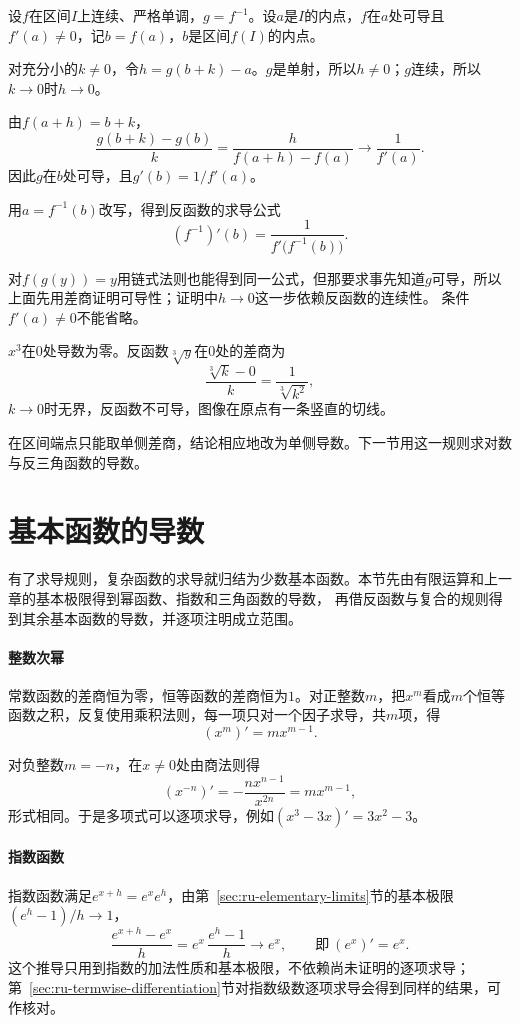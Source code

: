 设$f$在区间$I$上连续、严格单调，$g=f^{-1}$。设$a$是$I$的内点，$f$在$a$处可导且$f'(a)\neq0$，记$b=f(a)$，$b$是区间$f(I)$的内点。

对充分小的$k\neq0$，令$h=g(b+k)-a$。$g$是单射，所以$h\neq0$；$g$连续，所以$k\to0$时$h\to0$。

由$f(a+h)=b+k$，
\[
 \frac{g(b+k)-g(b)}k=\frac h{f(a+h)-f(a)}\to\frac1{f'(a)}.
\]
因此$g$在$b$处可导，且$g'(b)=1/f'(a)$。

用$a=f^{-1}(b)$改写，得到反函数的求导公式
\begin{equation}
 (f^{-1})'(b)=\frac1{f'\bigl(f^{-1}(b)\bigr)}.
 \label{eq:ru-inverse-derivative}
\end{equation}

对$f(g(y))=y$用链式法则也能得到同一公式，但那要求事先知道$g$可导，所以上面先用差商证明可导性；证明中$h\to0$这一步依赖反函数的连续性。
条件$f'(a)\neq0$不能省略。
\begin{example}[导数为零处反函数不可导]
\label{ex:ru-cube-root-not-differentiable}
$x^3$在$0$处导数为零。反函数$\sqrt[3]y$在$0$处的差商为
\[
 \frac{\sqrt[3]k-0}k=\frac1{\sqrt[3]{k^2}},
\]
$k\to0$时无界，反函数不可导，图像在原点有一条竖直的切线。
\end{example}

在区间端点只能取单侧差商，结论相应地改为单侧导数。下一节用这一规则求对数与反三角函数的导数。
\section{基本函数的导数}
\label{sec:ru-elementary-derivatives}
\label{sec:analysis-elementary-derivatives}

有了求导规则，复杂函数的求导就归结为少数基本函数。本节先由有限运算和上一章的基本极限得到幂函数、指数和三角函数的导数，
再借反函数与复合的规则得到其余基本函数的导数，并逐项注明成立范围。

\paragraph{整数次幂}
常数函数的差商恒为零，恒等函数的差商恒为$1$。对正整数$m$，把$x^m$看成$m$个恒等函数之积，反复使用乘积法则，每一项只对一个因子求导，共$m$项，得
\[
 (x^m)'=mx^{m-1}.
\]

对负整数$m=-n$，在$x\neq0$处由商法则得
\[
 (x^{-n})'=-\frac{nx^{n-1}}{x^{2n}}=mx^{m-1},
\]
形式相同。于是多项式可以逐项求导，例如$(x^3-3x)'=3x^2-3$。

\paragraph{指数函数}
指数函数满足$e^{x+h}=e^xe^h$，由第~\ref{sec:ru-elementary-limits}节的基本极限$(e^h-1)/h\to1$，
\[
 \frac{e^{x+h}-e^x}h=e^x\,\frac{e^h-1}h\to e^x,\qquad\text{即}\ (e^x)'=e^x.
\]
这个推导只用到指数的加法性质和基本极限，不依赖尚未证明的逐项求导；第~\ref{sec:ru-termwise-differentiation}节对指数级数逐项求导会得到同样的结果，可作核对。


